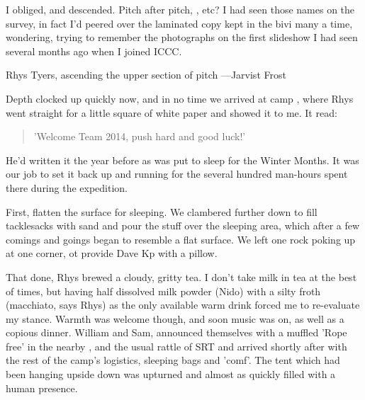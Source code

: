 I obliged, and descended. Pitch after pitch, ,  etc? I had seen those names on the survey, in fact I'd peered over the laminated copy kept in the bivi many a time, wondering, trying to remember the photographs on the first slideshow I had seen several months ago when I joined ICCC.


\begin{marginfigure}
\checkoddpage \ifoddpage \forcerectofloat \else \forceversofloat \fi
\centering
 \caption{Rhys Tyers, ascending the upper section of \protect{} pitch ---Jarvist Frost}
 \label{Laurel-up}
\end{marginfigure}

Depth clocked up quickly now, and in no time we arrived at camp , where Rhys went straight for a little square of white paper and showed it to me. It read:

\begin{quote}
'Welcome Team 2014, push hard and good luck!'
\end{quote}

He'd written it the year before as  was put to sleep for the Winter Months. It was our job to set it back up and running for the several hundred man-hours spent there during the expedition. 

First, flatten the surface for sleeping. We clambered further down  to fill tacklesacks with sand and pour the stuff over the sleeping area, which after a few comings and goings began to  resemble a flat surface. We left one rock poking up at one corner, ot provide Dave Kp with a pillow. 

That done, Rhys brewed a cloudy, gritty tea. I don't take milk in tea at the best of times, but having half dissolved milk powder (Nido) with a silty froth (macchiato, says Rhys) as the only available warm drink forced me to re-evaluate my stance. Warmth was welcome though, and soon music was on, as well as a copious dinner. William and Sam, announced themselves with a muffled 'Rope free' in the nearby , and the usual rattle of SRT and arrived shortly after with the rest of the camp's logistics, sleeping bags and 'comf'. The tent which had been hanging upside down was upturned and almost as quickly filled with a human presence. 

